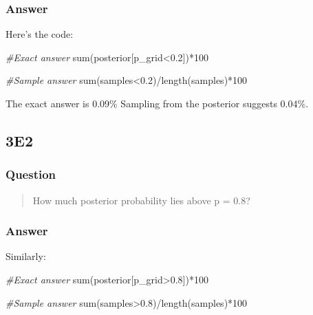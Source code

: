 \documentclass[
]{book}
\newenvironment{Shaded}{\begin{snugshade}}{\end{snugshade}}
\newcommand{\CommentTok}[1]{\textcolor[rgb]{0.56,0.35,0.01}{\textit{#1}}}
\newcommand{\DecValTok}[1]{\textcolor[rgb]{0.00,0.00,0.81}{#1}}
\newcommand{\FloatTok}[1]{\textcolor[rgb]{0.00,0.00,0.81}{#1}}
\newcommand{\FunctionTok}[1]{\textcolor[rgb]{0.00,0.00,0.00}{#1}}
\newcommand{\NormalTok}[1]{#1}
\newcommand{\SpecialCharTok}[1]{\textcolor[rgb]{0.00,0.00,0.00}{#1}}
\begin{document}
\hypertarget{answer-15}{%
\subsubsection*{Answer}\label{answer-15}}

Here's the code:

\begin{Shaded}
\begin{Highlighting}[]
\CommentTok{\#Exact answer}
\FunctionTok{sum}\NormalTok{(posterior[p\_grid}\SpecialCharTok{\textless{}}\FloatTok{0.2}\NormalTok{])}\SpecialCharTok{*}\DecValTok{100}

\CommentTok{\#Sample answer}
\FunctionTok{sum}\NormalTok{(samples}\SpecialCharTok{\textless{}}\FloatTok{0.2}\NormalTok{)}\SpecialCharTok{/}\FunctionTok{length}\NormalTok{(samples)}\SpecialCharTok{*}\DecValTok{100}
\end{Highlighting}
\end{Shaded}

The exact answer is 0.09\% Sampling from the posterior suggests 0.04\%.

\hypertarget{e2-1}{%
\subsection*{3E2}\label{e2-1}}

\hypertarget{question-16}{%
\subsubsection*{Question}\label{question-16}}

\begin{quote}
How much posterior probability lies above p = 0.8?
\end{quote}

\hypertarget{answer-16}{%
\subsubsection*{Answer}\label{answer-16}}

Similarly:

\begin{Shaded}
\begin{Highlighting}[]
\CommentTok{\#Exact answer}
\FunctionTok{sum}\NormalTok{(posterior[p\_grid}\SpecialCharTok{\textgreater{}}\FloatTok{0.8}\NormalTok{])}\SpecialCharTok{*}\DecValTok{100}

\CommentTok{\#Sample answer}
\FunctionTok{sum}\NormalTok{(samples}\SpecialCharTok{\textgreater{}}\FloatTok{0.8}\NormalTok{)}\SpecialCharTok{/}\FunctionTok{length}\NormalTok{(samples)}\SpecialCharTok{*}\DecValTok{100}
\end{Highlighting}
\end{Shaded}
\end{document}
